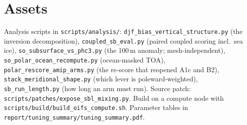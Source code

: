 \documentclass[10pt]{article}
\begin{document}
\section{Assets}\label{sec:assets}
Analysis scripts in \texttt{scripts/analysis/}: \texttt{djf\_bias\_vertical\_structure.py}
(the inversion decomposition), \texttt{coupled\_sb\_eval.py} (paired coupled scoring incl.\
sea ice), \texttt{so\_subsurface\_vs\_phc3.py} (the 100\,m anomaly; mesh-independent),
\texttt{so\_polar\_ocean\_recompute.py} (ocean-masked TOA), \texttt{polar\_rescore\_amip\_arms.py}
(the re-score that reopened A1c and B2), \texttt{stack\_meridional\_shape.py} (which lever
is poleward-weighted), \texttt{sb\_run\_length.py} (how long an arm must run).
Source patch: \texttt{scripts/patches/expose\_sbl\_mixing.py}. Build on a compute node with
\texttt{scripts/build/build\_oifs\_compute.sh}. Parameter tables in
\texttt{report/tuning\_summary/tuning\_summary.pdf}.
\end{document}
